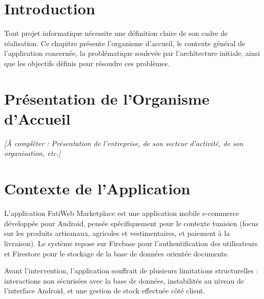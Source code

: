 \documentclass[12pt,a4paper]{report}
\begin{document}
\section{Introduction}
Tout projet informatique nécessite une définition claire de son cadre de réalisation. Ce chapitre présente l'organisme d'accueil, le contexte général de l'application concernée, la problématique soulevée par l'architecture initiale, ainsi que les objectifs définis pour résoudre ces problèmes.

\section{Présentation de l'Organisme d'Accueil}
\textit{[À compléter : Présentation de l'entreprise, de son secteur d'activité, de son organisation, etc.]}

\section{Contexte de l'Application}
L'application FatiWeb Marketplace est une application mobile e-commerce développée pour Android, pensée spécifiquement pour le contexte tunisien (focus sur les produits artisanaux, agricoles et vestimentaires, et paiement à la livraison). Le système repose sur Firebase pour l'authentification des utilisateurs et Firestore pour le stockage de la base de données orientée documents. 

Avant l'intervention, l'application souffrait de plusieurs limitations structurelles : interactions non sécurisées avec la base de données, instabilités au niveau de l'interface Android, et une gestion de stock effectuée côté client.
\end{document}
